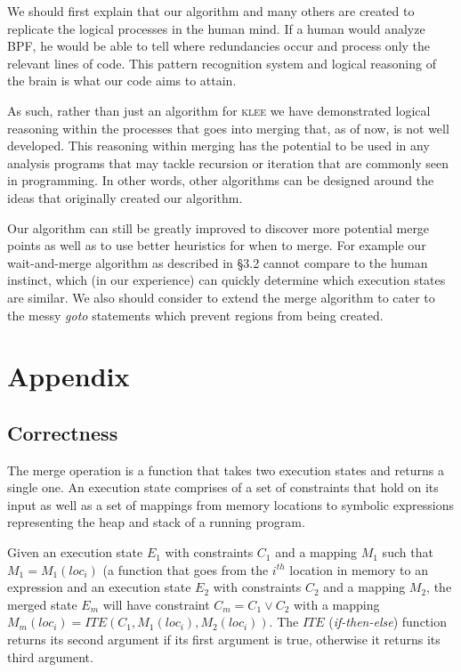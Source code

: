 \documentclass[12pt,a4paper]{article}
\newcommand{\klee}{\textsc{klee }}
\begin{document}
We should first explain that our algorithm and many others are created to replicate the logical processes in the human mind. If a human would analyze BPF, he would be able to tell where redundancies occur and process only the relevant lines of code. This pattern recognition system and logical reasoning of the brain is what our code aims to attain.

As such, rather than just an algorithm for \klee we have demonstrated logical reasoning within the processes that goes into merging that, as of now, is not well developed. This reasoning within merging has the potential to be used in any analysis programs that may tackle recursion or iteration that are commonly seen in programming. In other words, other algorithms can be designed around the ideas that originally created our algorithm.

Our algorithm can still be greatly improved to discover more potential merge points as well as to use better heuristics for when to merge. For example our wait-and-merge algorithm as described in \S 3.2 cannot compare to the human instinct, which (in our experience) can quickly determine which execution states are similar. We also should consider to extend the merge algorithm to cater to the messy \emph{goto} statements which prevent regions from being created. 

\section{Appendix}

\subsection{Correctness}
The merge operation is a function that takes two execution states and returns a single one. An execution state comprises of a set of constraints that hold on its input as well as a set of mappings from memory locations to symbolic expressions representing the heap and stack of a running program.

Given an execution state $E_1$ with constraints $C_1$ and a mapping $M_1$ such that $M_1 = M_1(loc_i)$ (a function that goes from the $i^{th}$ location in memory to an expression and an execution state $E_2$ with constraints $C_2$ and a mapping $M_2$, the merged state $E_m$ will have constraint $C_m = C_1 \vee C_2$ with a mapping $M_m(loc_i) = ITE(C_1, M_1(loc_i), M_2(loc_i))$. The $ITE$ (\emph{if-then-else}) function returns its second argument if its first argument is true, otherwise it returns its third argument.
\end{document}
